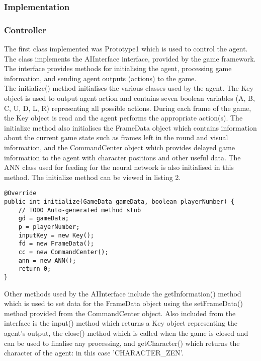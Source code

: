 \documentclass[12pt,a4paper]{article}
\begin{document}
\subsubsection{Implementation}

\subsubsection*{Controller}

\vspace{3mm}

The first class implemented was Prototype1 which is used to control the agent. The class implements the AIInterface interface, provided by the game framework. The interface provides methods for initialising the agent, processing game information, and sending agent outputs (actions) to the game.\\

The initialize() method initialises the various classes used by the agent. The Key object is used to output agent action and contains seven boolean variables (A, B, C, U, D, L, R) representing all possible actions. During each frame of the game, the Key object is read and the agent performs the appropriate action(s). The initialize method also initialises the FrameData object which contains information about the current game state such as frames left in the round and visual information, and the CommandCenter object which provides delayed game information to the agent with character positions and other useful data. The ANN class used for feeding for the neural network is also initialised in this method. The initialize method can be viewed in listing 2.

\vspace{5mm}

\begin{lstlisting}[caption=initialize method in Prototype1.java.]
@Override
public int initialize(GameData gameData, boolean playerNumber) {
	// TODO Auto-generated method stub
	gd = gameData;
	p = playerNumber;
	inputKey = new Key();
	fd = new FrameData();
	cc = new CommandCenter();
	ann = new ANN();
	return 0;
}
\end{lstlisting}

\newpage
Other methods used by the AIInterface include the getInformation() method which is used to set data for the FrameData object using the setFrameData() method provided from the CommandCenter object. Also included from the interface is the input() method which returns a Key object representing the agent's output, the close() method which is called when the game is closed and can be used to finalise any processing, and getCharacter() which returns the character of the agent: in this case 'CHARACTER\_ZEN'.\\
\end{document}
